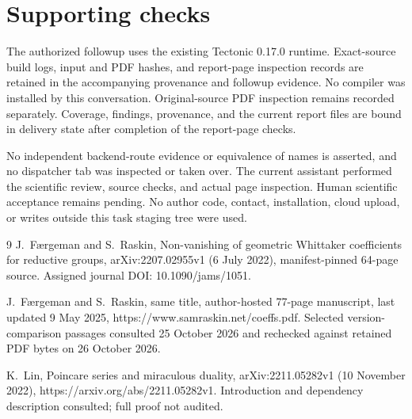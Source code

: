 \documentclass[10pt]{article}
\begin{document}
\section*{Supporting checks}
The authorized followup uses the existing Tectonic 0.17.0 runtime. Exact-source build logs, input and PDF hashes, and report-page inspection records are retained in the accompanying provenance and followup evidence. No compiler was installed by this conversation. Original-source PDF inspection remains recorded separately. Coverage, findings, provenance, and the current report files are bound in delivery state after completion of the report-page checks.\par
No independent backend-route evidence or equivalence of names is asserted, and no dispatcher tab was inspected or taken over. The current assistant performed the scientific review, source checks, and actual page inspection. Human scientific acceptance remains pending. No author code, contact, installation, cloud upload, or writes outside this task staging tree were used.\par
9 J. Færgeman and S. Raskin, Non-vanishing of geometric Whittaker coefficients for reductive groups, arXiv:2207.02955v1 (6 July 2022), manifest-pinned 64-page source. Assigned journal DOI: 10.1090/jams/1051.\par
J. Færgeman and S. Raskin, same title, author-hosted 77-page manuscript, last updated 9 May 2025, https://www.samraskin.net/coeffs.pdf. Selected version-comparison passages consulted 25 October 2026 and rechecked against retained PDF bytes on 26 October 2026.\par
K. Lin, Poincare series and miraculous duality, arXiv:2211.05282v1 (10 November 2022), https://arxiv.org/abs/2211.05282v1. Introduction and dependency description consulted; full proof not audited.\par
\end{document}
